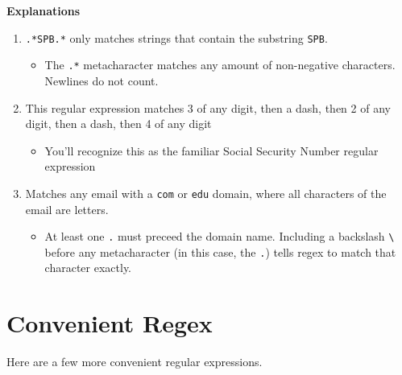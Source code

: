 \documentclass[
  letterpaper,
  DIV=11,
  numbers=noendperiod]{scrreprt}
\providecommand{\tightlist}{%
  \setlength{\itemsep}{0pt}\setlength{\parskip}{0pt}}\usepackage{longtable,booktabs,array}
\begin{document}
\textbf{Explanations}

\begin{enumerate}
\def\labelenumi{\arabic{enumi}.}
\tightlist
\item
  \texttt{.*SPB.*} only matches strings that contain the substring
  \texttt{SPB}.

  \begin{itemize}
  \tightlist
  \item
    The \texttt{.*} metacharacter matches any amount of non-negative
    characters. Newlines do not count.\\
  \end{itemize}
\item
  This regular expression matches 3 of any digit, then a dash, then 2 of
  any digit, then a dash, then 4 of any digit

  \begin{itemize}
  \tightlist
  \item
    You'll recognize this as the familiar Social Security Number regular
    expression
  \end{itemize}
\item
  Matches any email with a \texttt{com} or \texttt{edu} domain, where
  all characters of the email are letters.

  \begin{itemize}
  \tightlist
  \item
    At least one \texttt{.} must preceed the domain name. Including a
    backslash \texttt{\textbackslash{}} before any metacharacter (in
    this case, the \texttt{.}) tells regex to match that character
    exactly.
  \end{itemize}
\end{enumerate}

\hypertarget{convenient-regex}{%
\section{Convenient Regex}\label{convenient-regex}}

Here are a few more convenient regular expressions.
\end{document}
